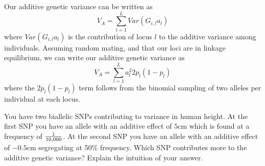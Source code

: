 Our additive genetic variance can be written as
\begin{equation}
V_A = \sum_{l=1}^L Var(G_{i,l} a_{l})
\end{equation}
where $Var(G_{i,l} a_{l})$ is the contribution of locus $l$ to the additive
variance among individuals. Assuming random mating, and that our loci are in linkage equilibrium, we can write our additive genetic variance as
\begin{equation}
V_A = \sum_{l=1}^L a_{l}^2 2 p_l(1-p_l)  \label{eqn:VA}
\end{equation}
where the $ 2 p_l(1-p_l)$ term follows from the binomial sampling of two alleles per individual at each locus. \\

\begin{question}
You have two biallelic SNPs contributing to variance in human height. At the first SNP you have an allele with an additive effect of $5$cm which is found at a frequency of $\nicefrac{1}{10,000}$. At the second SNP you have an allele with an additive effect of $-0.5$cm segregating at 50\% frequency. Which SNP contributes more to the additive genetic variance? Explain the intuition of your answer.
\end{question}
